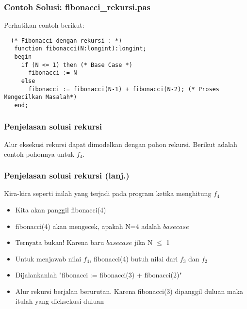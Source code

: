 \begin{frame}[fragile]
\frametitle{Contoh Solusi: fibonacci\_rekursi.pas}
Perhatikan contoh berikut:
\begin{lstlisting}
  (* Fibonacci dengan rekursi : *)
   function fibonacci(N:longint):longint;
   begin
     if (N <= 1) then (* Base Case *)
       fibonacci := N
     else
       fibonacci := fibonacci(N-1) + fibonacci(N-2); (* Proses Mengecilkan Masalah*)
   end;
\end{lstlisting}
\end{frame}

\begin{frame}[fragile]
\frametitle{Penjelasan solusi rekursi}
Alur eksekusi rekursi dapat dimodelkan dengan pohon rekursi. Berikut adalah contoh pohonnya untuk $f_4$.
\end{frame}

\begin{frame}
\frametitle{Penjelasan solusi rekursi (lanj.)}
Kira-kira seperti inilah yang terjadi pada program ketika menghitung $f_4$
\begin {itemize}
  \item Kita akan panggil fibonacci(4)
  \item fibonacci(4) akan mengecek, apakah N=4 adalah $base case$
  \item Ternyata bukan! Karena baru $base case$ jika N $\le$ 1
  \item Untuk menjawab nilai $f_4$, fibonacci(4)  butuh nilai dari $f_3$ dan $f_2$
  \item Dijalankanlah "fibonacci := fibonacci(3) + fibonacci(2)"
  \item Alur rekursi berjalan berurutan. Karena fibonacci(3) dipanggil duluan maka itulah yang dieksekusi duluan
\end{itemize}
\end{frame}

